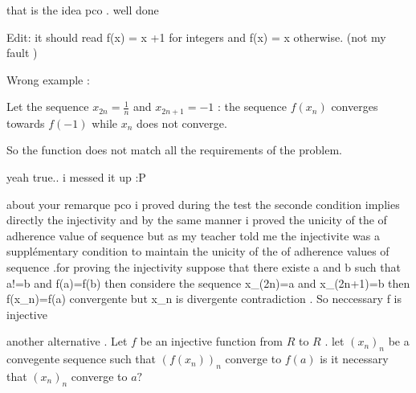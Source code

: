 \begin{solution}
	that is the idea pco . well done
\end{solution}



\begin{solution}
	\begin{tcolorbox}Edit: it should read f(x) = x +1 for integers and f(x) = x otherwise. (not my fault )\end{tcolorbox}

Wrong example :

Let the sequence $x_{2n}=\frac 1n$ and $x_{2n+1}=-1$ : the sequence $f(x_n)$ converges towards $f(-1)$ while $x_n$ does not converge.

So the function does not match all the requirements of the problem.
\end{solution}



\begin{solution}
	yeah true.. i messed it up :P
\end{solution}



\begin{solution}
	about your remarque  pco i proved during the test the seconde condition implies directly the injectivity and by the same manner i proved the unicity of  the  of adherence value of sequence but as my teacher told me the injectivite was a supplémentary condition to maintain the unicity of the  of adherence values of sequence .for proving the injectivity suppose that there existe a and b such that a!=b and f(a)=f(b) then considere the sequence x_(2n)=a and x_(2n+1)=b then f(x_n)=f(a) convergente but x_n is divergente contradiction . So neccessary f is injective
\end{solution}



\begin{solution}
	another alternative .
Let $f$ be an injective function from $R$ to $R$ .
let $(x_n)_n$ be a convegente sequence such that $(f(x_n))_n$ converge to $f(a)$
is it necessary that $(x_n)_n$ converge to $a ?$
\end{solution}



